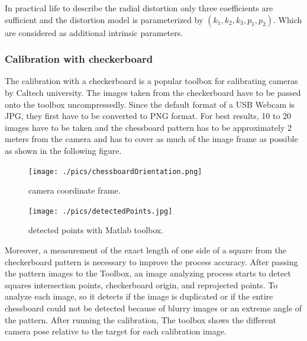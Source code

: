 \documentclass[journal,final,a4paper,twoside]{PS}
\begin{document}
In practical life to describe the radial distortion only three coefficients are sufficient and the distortion model is parameterized by $(k_1,k_2,k_3,p_1,p_2)$. Which are considered as additional intrinsic parameters.

\subsubsection{Calibration with checkerboard}
\label{sec:checkerboard}
The calibration with a checkerboard is a popular toolbox for calibrating cameras by Caltech university. The images taken from the checkerboard have to be passed onto the toolbox uncompressedly. Since the default format of a USB Webcam is JPG, they first have to be converted to PNG format. For best results, 10 to 20 images have to be taken and the chessboard pattern has to be approximately 2 meters from the camera and has to cover as much of the image frame as possible as shown in the following figure.


\begin{figure}[h]
\centering
\parbox{4cm}{
\texttt{[image: ./pics/chessboardOrientation.png]}
\caption{camera coordinate frame\cite{matlab}.}
\label{fig:cameraCoordinateFrame}}
\qquad
\begin{minipage}{4cm}
\texttt{[image: ./pics/detectedPoints.jpg]}
\caption{detected points with Matlab toolbox\cite{matlab}.}
\label{fig:detectedPoints}
\end{minipage}
\end{figure}


Moreover, a measurement of the exact length of one side of a square from the checkerboard pattern is necessary to improve the process accuracy. After passing the pattern images to the Toolbox, an image analyzing process starts to detect squares intersection points, checkerboard origin, and reprojected points.
To analyze each image, so it detects if the image is duplicated or if the entire chessboard could not be detected because of blurry images or an extreme angle of the pattern. After running the calibration,  The toolbox shows the different camera pose relative to the target for each calibration image.
\end{document}
